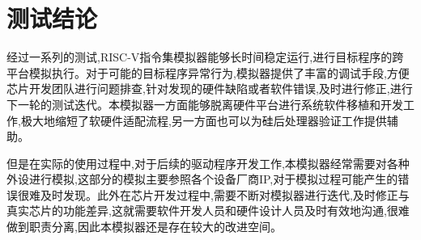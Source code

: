 \section{测试结论}
经过一系列的测试,RISC-V指令集模拟器能够长时间稳定运行,进行目标程序的跨平台模拟执行。对于可能的目标程序异常行为,模拟器提供了丰富的调试手段,方便芯片开发团队进行问题排查,针对发现的硬件缺陷或者软件错误,及时进行修正,进行下一轮的测试迭代。本模拟器一方面能够脱离硬件平台进行系统软件移植和开发工作,极大地缩短了软硬件适配流程,另一方面也可以为硅后处理器验证工作提供辅助。


但是在实际的使用过程中,对于后续的驱动程序开发工作,本模拟器经常需要对各种外设进行模拟,这部分的模拟主要参照各个设备厂商IP,对于模拟过程可能产生的错误很难及时发现。此外在芯片开发过程中,需要不断对模拟器进行迭代,及时修正与真实芯片的功能差异,这就需要软件开发人员和硬件设计人员及时有效地沟通,很难做到职责分离,因此本模拟器还是存在较大的改进空间。
